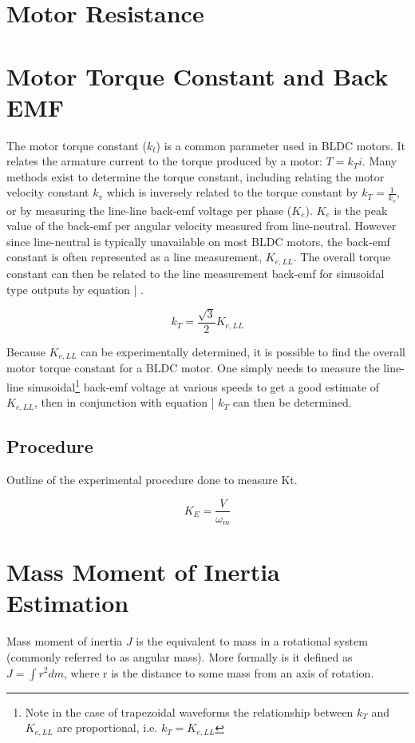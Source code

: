 
\section{Motor Resistance}

\section{Motor Torque Constant and Back EMF}
The motor torque constant (\(k_t\)) is a common parameter used in BLDC motors. It relates the armature current to the torque produced by a motor: \(T = k_T i \). Many methods exist to determine the torque constant, including relating the motor velocity constant \(k_v\) which is inversely related to the torque constant by \(k_T = \frac{1}{k_v} \), or by measuring the line-line back-emf voltage per phase (\(K_e\)). \(K_e\) is the peak value of the back-emf per angular velocity measured from line-neutral. However since line-neutral is typically unavailable on most BLDC motors, the back-emf constant is often represented as a line measurement, \(K_{e,LL}\). The overall torque constant can then be related to the line measurement back-emf for sinusoidal type outputs by equation | \citep{5}. 

\[k_T = \frac{\sqrt{3}}{2} K_{e,LL}\]

Because \(K_{e,LL}\) can be experimentally determined, it is possible to find the overall motor torque constant for a BLDC motor. One simply needs to measure the line-line sinusoidal\footnote{Note in the case of trapezoidal waveforms the relationship between \(k_T\) and \(K_{e,LL}\) are proportional, i.e. \(k_T = K_{e,LL}\)} back-emf voltage at various speeds to get a good estimate of \(K_{e,LL}\), then in conjunction with equation | \(k_T\) can then be determined.

\subsection{Procedure}
Outline of the experimental procedure done to measure Kt.

\[K_E = \frac{V}{\omega_m}\]

\section{Mass Moment of Inertia Estimation}
Mass moment of inertia \(J\) is the equivalent to mass in a rotational system (commonly referred to as angular mass). More formally is it defined as \(J = \int r^2 dm\), where r is the distance to some mass from an axis of rotation.

